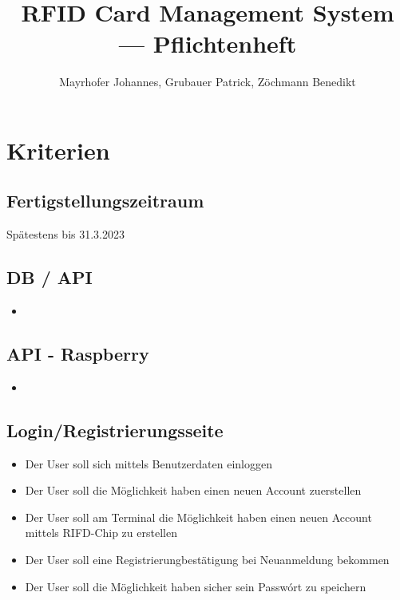 \documentclass[a4paper]{article}
\title{\Huge{\textbf{RFID Card Management System --- Pflichtenheft}}}
\author{Mayrhofer Johannes, Grubauer Patrick, Zöchmann Benedikt}
\date{\DateCreated}
\begin{document}
\maketitle

\tableofcontents

\newpage
\section{Kriterien}
\subsection{Fertigstellungszeitraum}
Sp\"atestens bis 31.3.2023
\subsection{DB / API}
\begin{itemize}
\item 
\end{itemize}

\subsection{API - Raspberry}
\begin{itemize}
\item 
\end{itemize}

\subsection{Login/Registrierungsseite}
\begin{itemize}
  \item Der User soll sich mittels Benutzerdaten einloggen
  \item Der User soll die M\"oglichkeit haben einen neuen Account zuerstellen 
  \item Der User soll am Terminal die M\"oglichkeit haben einen neuen Account mittels RIFD-Chip zu erstellen
  \item Der User soll eine Registrierungbest\"atigung bei Neuanmeldung bekommen
  \item Der User soll die M\"oglichkeit haben sicher sein Passw\'ort zu speichern
\end{itemize}
\end{document}
